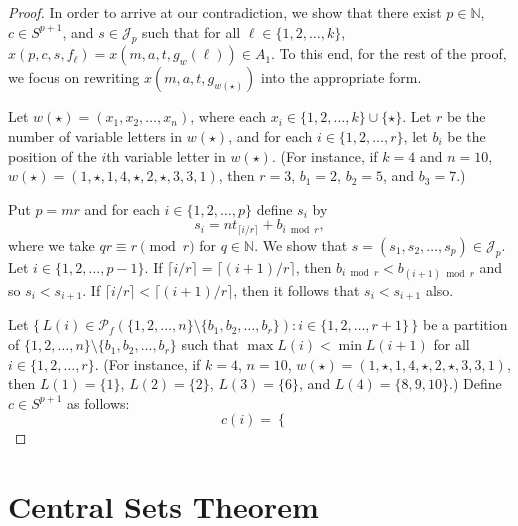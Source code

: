 \documentclass[12pt]{article}
\theoremstyle{plain}
\theoremstyle{definition}
\newcommand{\bbN}{\mathbb{N}}
\newcommand{\calJ}{\mathcal{J}}
\newcommand{\Pf}{\mathcal{P}_f}
\begin{document}
\begin{proof}
  In order to arrive at our contradiction, we show that there exist $p \in \bbN$, $c \in S^{p+1}$, and $s \in \calJ_p$ such that for all $\ell \in \{1, 2, \ldots, k\}$, $ x(p, c, s, f_\ell) = x(m, a, t, g_w(\ell)) \in A_1$. 
  To this end, for the rest of the proof, we focus on rewriting $x(m, a, t, g_{w(\star)})$ into the appropriate form. 

  Let $w(\star) = (x_1, x_2, \ldots, x_n)$, where each $x_i \in \{1, 2, \ldots, k\} \cup \{\star\}$. 
  Let $r$ be the number of variable letters in $w(\star)$, and for each $i \in \{1, 2, \ldots, r\}$, let $b_i$ be the position of the \mbox{$i$th} variable letter in $w(\star)$.
  (For instance, if $k = 4$ and $n = 10$, $w(\star) = (1, \star, 1, 4, \star, 2, \star, 3, 3, 1)$, then $r = 3$, $b_1 = 2$, $b_2 = 5$, and $b_3 = 7$.)

  Put $p = mr$ and for each $i \in \{1, 2, \ldots, p\}$ define $s_i$ by
  \[
    s_i = nt_{\lceil i/r \rceil} + b_{i \bmod r},    
  \]
where we take $qr \equiv r \pmod r$ for $q \in \bbN$.
  We show that $s = (s_1, s_2, \ldots, s_p) \in \calJ_p$.
  Let $i \in \{1, 2, \ldots, p-1\}$.
  If $\lceil i/r \rceil = \lceil (i+1)/r \rceil$, then $b_{i \bmod r} < b_{(i+1) \bmod r}$ and so $s_i < s_{i+1}$.
  If $\lceil i/r \rceil < \lceil (i+1)/r \rceil$, then it follows that $s_i < s_{i+1}$ also.

  Let $\bigl\{\, L(i) \in \Pf(\{1, 2, \ldots, n\} \setminus \{b_1, b_2, \ldots, b_r\}) : i \in \{1, 2, \ldots, r+1\} \,\bigr\}$ be a partition of $\{1, 2, \ldots, n\} \setminus \{b_1, b_2, \ldots, b_r\}$ such that $\max L(i) < \min L(i+1)$ for all $i \in \{1, 2, \ldots, r\}$.
  (For instance, if $k = 4$, $n = 10$, $w(\star) = (1, \star, 1, 4, \star, 2, \star, 3, 3, 1)$, then $L(1) = \{1\}$, $L(2) = \{2\}$, $L(3) = \{6\}$, and $L(4) = \{8, 9, 10\}$.)
  Define $c \in S^{p+1}$ as follows:
  \[
    c(i) = 
    \begin{cases}
      
    \end{cases}
  \]
  
\end{proof}


\section{Central Sets Theorem}




\end{document}

